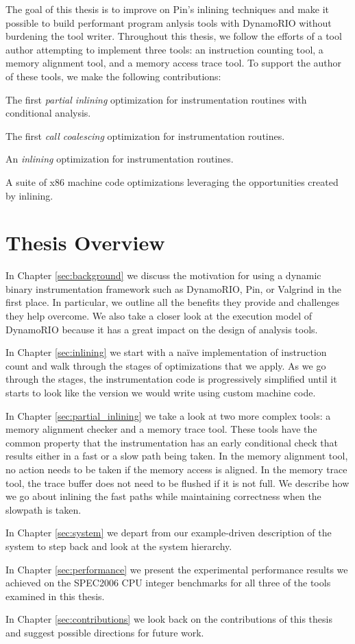 The goal of this thesis is to improve on Pin's inlining techniques and make it
possible to build performant program anlysis tools with DynamoRIO without
burdening the tool writer.  Throughout this thesis, we follow the efforts of a
tool author attempting to implement three tools: an instruction counting tool, a
memory alignment tool, and a memory access trace tool.  To support the author
of these tools, we make the following contributions:

\begin{packed_itemize}
\item The first {\em partial inlining} optimization for instrumentation
routines with conditional analysis.
\item The first {\em call coalescing} optimization for instrumentation
routines.
\item An {\em inlining} optimization for instrumentation routines.
\item A suite of x86 machine code optimizations leveraging the opportunities
created by inlining.
\end{packed_itemize}

\section{Thesis Overview}

In Chapter \ref{sec:background} we discuss the motivation for using a dynamic
binary instrumentation framework such as DynamoRIO, Pin, or Valgrind in the
first place.  In particular, we outline all the benefits they provide and
challenges they help overcome.  We also take a closer look at the execution
model of DynamoRIO because it has a great impact on the design of analysis
tools.

In Chapter \ref{sec:inlining} we start with a na\"ive implementation of
instruction count and walk through the stages of optimizations that we apply.
As we go through the stages, the instrumentation code is progressively
simplified until it starts to look like the version we would write using custom
machine code.

In Chapter \ref{sec:partial_inlining} we take a look at two more complex tools:
a memory alignment checker and a memory trace tool.  These tools have the common
property that the instrumentation has an early conditional check that results
either in a fast or a slow path being taken.  In the memory alignment tool, no
action needs to be taken if the memory access is aligned.  In the memory trace
tool, the trace buffer does not need to be flushed if it is not full.  We
describe how we go about inlining the fast paths while maintaining correctness
when the slowpath is taken.

In Chapter \ref{sec:system} we depart from our example-driven description of
the system to step back and look at the system hierarchy.

In Chapter \ref{sec:performance} we present the experimental performance results
we achieved on the SPEC2006 CPU integer benchmarks\cite{spec_cpu_2k6} for all
three of the tools examined in this thesis.

In Chapter \ref{sec:contributions} we look back on the contributions of this
thesis and suggest possible directions for future work.

